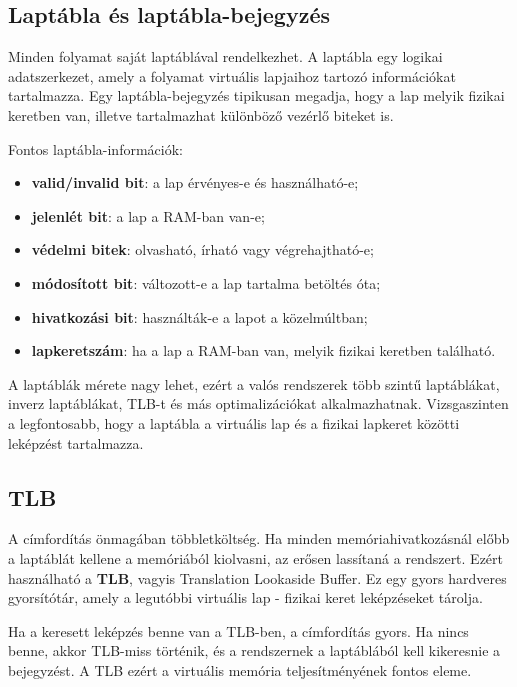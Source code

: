 \begin{center}

\end{center}

\subsection{Laptábla és laptábla-bejegyzés}

Minden folyamat saját laptáblával rendelkezhet. A laptábla egy logikai adatszerkezet, amely a folyamat virtuális lapjaihoz tartozó információkat tartalmazza. Egy laptábla-bejegyzés tipikusan megadja, hogy a lap melyik fizikai keretben van, illetve tartalmazhat különböző vezérlő biteket is.

Fontos laptábla-információk:

\begin{itemize}
  \item \textbf{valid/invalid bit}: a lap érvényes-e és használható-e;
  \item \textbf{jelenlét bit}: a lap a RAM-ban van-e;
  \item \textbf{védelmi bitek}: olvasható, írható vagy végrehajtható-e;
  \item \textbf{módosított bit}: változott-e a lap tartalma betöltés óta;
  \item \textbf{hivatkozási bit}: használták-e a lapot a közelmúltban;
  \item \textbf{lapkeretszám}: ha a lap a RAM-ban van, melyik fizikai keretben található.
\end{itemize}

A laptáblák mérete nagy lehet, ezért a valós rendszerek több szintű laptáblákat, inverz laptáblákat, TLB-t és más optimalizációkat alkalmazhatnak. Vizsgaszinten a legfontosabb, hogy a laptábla a virtuális lap és a fizikai lapkeret közötti leképzést tartalmazza.

\subsection{TLB}

A címfordítás önmagában többletköltség. Ha minden memóriahivatkozásnál előbb a laptáblát kellene a memóriából kiolvasni, az erősen lassítaná a rendszert. Ezért használható a \textbf{TLB}, vagyis Translation Lookaside Buffer. Ez egy gyors hardveres gyorsítótár, amely a legutóbbi virtuális lap - fizikai keret leképzéseket tárolja.

Ha a keresett leképzés benne van a TLB-ben, a címfordítás gyors. Ha nincs benne, akkor TLB-miss történik, és a rendszernek a laptáblából kell kikeresnie a bejegyzést. A TLB ezért a virtuális memória teljesítményének fontos eleme.

